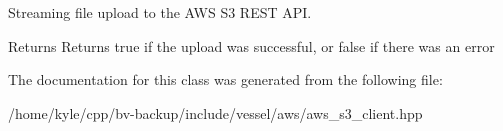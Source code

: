Streaming file upload to the A\+WS S3 R\+E\+ST A\+PI. 

\begin{DoxyReturn}{Returns}
Returns true if the upload was successful, or false if there was an error 
\end{DoxyReturn}


The documentation for this class was generated from the following file\+:\begin{DoxyCompactItemize}
\item 
/home/kyle/cpp/bv-\/backup/include/vessel/aws/aws\+\_\+s3\+\_\+client.\+hpp\end{DoxyCompactItemize}
